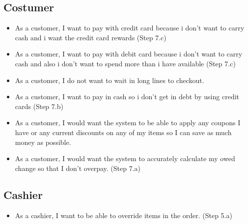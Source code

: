 \documentclass[12pt]{article}
\begin{document}
\subsection{Costumer}
    \begin{itemize}
        \item As a customer, I want to pay with credit card because 
        i don’t want to carry cash and i want the credit 
        card rewards (Step 7.c)
        \item As a customer, I want to pay with debit card because i don’t 
        want to carry cash and also i don’t want to spend 
        more than i have available (Step 7.c)
        \item As a customer, I do not want to wait in long lines to checkout.
        \item As a customer, I want to pay in cash so i don’t get in 
        debt by using credit cards (Step 7.b)
        \item As a customer, I would want the system to be able to apply any 
        coupons I have or any current discounts on any of my items 
        so I can save as much money as possible.
        \item As a customer, I would want the system to accurately 
        calculate my owed change so that I don’t overpay. (Step 7.a)
    \end{itemize}
\subsection{Cashier}
\begin{itemize}
    \item As a cashier, I want to be able to override items in 
    the order. (Step 5.a)
\end{itemize}
\end{document}
